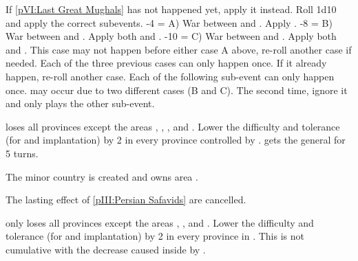 
\condition{}
\aparag If \ref{pVI:Last Great Mughals} has not happened yet, apply it
instead.
\aparag Roll 1d10 and apply the correct subevents.
-4 = A) War between \paysmogol and \paysperse. Apply
.
-8 = B) War between \paysafghans and \paysperse. Apply both
 and .
-10 = C) War between \paysafghans and \paysmogol. Apply both
 and . This
case may not happen before either case A above, re-roll another case if
needed.
\aparag Each of the three previous cases can only happen once. If it already
happen, re-roll another case.
\aparag Each of the following sub-event can only happen
once.  may occur due to two different cases
(B and C). The second time, ignore it and only plays the other sub-event.



\phevnt
\aparag \paysmogol loses all provinces except the areas \granderegionDelhi,
\granderegionAoudh, \granderegionBengale, \granderegionGondwana and
\granderegionOrissa.
\aparag Lower the difficulty and tolerance (for \COL and \TP implantation) by
2 in every province controlled by \paysmogol.
\aparag \paysperse gets the general  for 5 turns.



\phevnt
\aparag The minor country \paysafghans is created and owns area
\granderegionAfghanistan.



\phevnt
\aparag The lasting effect of \ref{pIII:Persian Safavids} are cancelled.



\phevnt
\aparag \paysmogol only loses all provinces except the areas
\granderegionDelhi, \granderegionAoudh, \granderegionBengale and
\granderegionGondwana.
\aparag Lower the difficulty and tolerance (for \COL and \TP implantation) by
2 in every province in \continentIndia.
\bparag This is not cumulative with the decrease caused inside \paysmogol by
.




